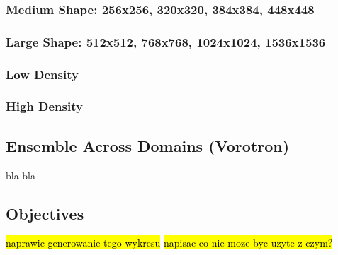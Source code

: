 \documentclass[format=acmsmall,screen,review,authordraft,nonacm]{acmart}
\newcommand{\ourjfa}{Vorotron} %
\begin{document}
\subsubsection{Medium Shape: 256x256, 320x320, 384x384, 448x448}
\subsubsection{Large Shape: 512x512, 768x768, 1024x1024, 1536x1536}

\subsubsection{Low Density}
\subsubsection{High Density}


\subsection{Ensemble Across Domains (\ourjfa)} %

bla bla

\subsection{Objectives} %

\hl{naprawic generowanie tego wykresu}
\hl{napisac co nie moze byc uzyte z czym?}
\end{document}
